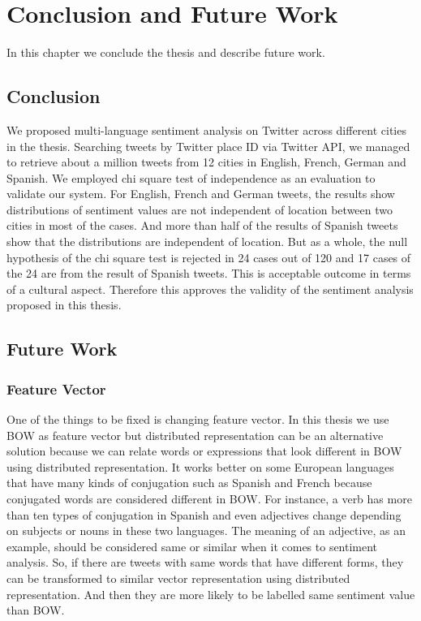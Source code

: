 \chapter{Conclusion and Future Work}
In this chapter we conclude the thesis and describe future work.
\section{Conclusion}
We proposed multi-language sentiment analysis on Twitter across different cities in the thesis.
Searching tweets by Twitter place ID via Twitter API, we managed to retrieve about a million tweets from 12 cities in English, French, German and Spanish.
We employed chi square test of independence as an evaluation to validate our system.
For English, French and German tweets, the results show distributions of sentiment values are not independent of location between two cities in most of the cases.
And more than half of the results of Spanish tweets show that the distributions are independent of location. 
But as a whole, the null hypothesis of the chi square test is rejected in 24 cases out of 120 and 17 cases of the 24 are from the result of Spanish tweets.
This is acceptable outcome in terms of a cultural aspect.
Therefore this approves the validity of the sentiment analysis proposed in this thesis.


\section{Future Work}
\subsection{Feature Vector}
One of the things to be fixed is changing feature vector.
In this thesis we use BOW as feature vector but distributed representation can be an alternative solution because we can relate words or expressions that look different in BOW using distributed representation.
It works better on some European languages that have many kinds of conjugation such as Spanish and French because conjugated words are considered different in BOW. 
For instance, a verb has more than ten types of conjugation in Spanish and even adjectives change depending on subjects or nouns in these two languages.
The meaning of an adjective, as an example, should be considered same or similar when it comes to sentiment analysis.
So, if there are tweets with same words that have different forms, they can be transformed to similar vector representation using distributed representation.
And then they are more likely to be labelled same sentiment value than BOW.

